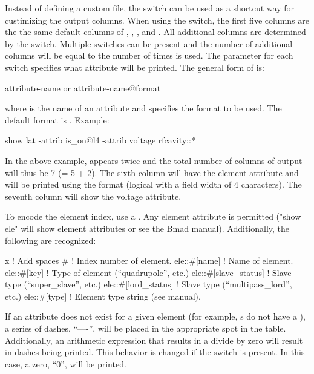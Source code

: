 {{{\begin{description}
Instead of defining a custom file, the  switch
can be used as a shortcut way for custimizing the output columns.
When using the  switch, the first five columns are the
the same default columns of , , ,
 and . All additional columns are determined by the
 switch. Multiple  switches can be
present and the number of additional columns will be equal to the
number of times  is used.  The  parameter
for each  switch specifies what attribute will be printed.
The general form of  is:
\begin{example}
  attribute-name         or
  attribute-name@format
\end{example}
where  is the name of an attribute and  
specifies the format to be used. The default format is .
Example:
\begin{example}
  show lat -attrib is_on@l4 -attrib voltage rfcavity::*
\end{example}
In the above example,  appears twice and the total
number of columns of output will thus be 7 (= 5 + 2). The sixth column
will have the  element attribute and will be printed using
the  format (logical with a field width of 4 characters). The
seventh column will show the voltage attribute.

To encode the element index, use a \vn{\#}.
Any element attribute is permitted ("show ele" will show element
attributes or see the Bmad manual). Additionally, the following are
recognized:
\begin{example}
  x                          ! Add spaces
  #                          ! Index number of element.
  ele::#[name]                ! Name of element.
  ele::#[key]                 ! Type of element (``quadrupole'', etc.)
  ele::#[slave_status]        ! Slave type (``super_slave'', etc.)
  ele::#[lord_status]         ! Slave type (``multipass_lord'', etc.)
  ele::#[type]                ! Element type string (see \bmad manual).
\end{example}
If an attribute does not exist for a given element (for example,
s do not have a ), a series of dashes,
``----'', will be placed in the appropriate spot in the table.
Additionally, an arithmetic expression that results in a divide by
zero will result in dashes being printed. This behavior is changed if
the  switch is present. In this case, a zero, ``0'', will
be printed. 


\end{description}}}}

